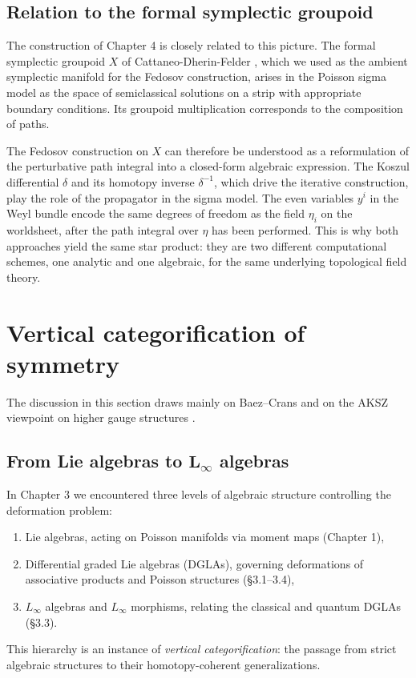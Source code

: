 \documentclass[
  12pt,
  a4paper, oneside
]{report}
\theoremstyle{bolddef}
\theoremstyle{remark}
\numberwithin{equation}{chapter}
\begin{document}
\subsection*{Relation to the formal symplectic groupoid}

The construction of Chapter 4 is closely related to this picture. The formal symplectic groupoid $X$ of Cattaneo-Dherin-Felder \cite{CDF}, which we used as the ambient symplectic manifold for the Fedosov construction, arises in the Poisson sigma model as the space of semiclassical solutions on a strip with appropriate boundary conditions. Its groupoid multiplication corresponds to the composition of paths.

The Fedosov construction on $X$ can therefore be understood as a reformulation of the perturbative path integral into a closed-form algebraic expression. The Koszul differential $\delta$ and its homotopy inverse $\delta^{-1}$, which drive the iterative construction, play the role of the propagator in the sigma model. The even variables $y^i$ in the Weyl bundle encode the same degrees of freedom as the field $\eta_i$ on the worldsheet, after the path integral over $\eta$ has been performed. This is why both approaches yield the same star product: they are two different computational schemes, one analytic and one algebraic, for the same underlying topological field theory.


\section{Vertical categorification of symmetry}
The discussion in this section draws mainly on Baez--Crans and on the AKSZ viewpoint on higher gauge structures \cite{BaezCrans,AKSZ}.


\subsection*{From Lie algebras to \texorpdfstring{$\mathbf{L_{\infty}}$}{L-infinity} algebras}

In Chapter 3 we encountered three levels of algebraic structure controlling the deformation problem:
\begin{enumerate}
\item Lie algebras, acting on Poisson manifolds via moment maps (Chapter 1),
\item Differential graded Lie algebras (DGLAs), governing deformations of associative products and Poisson structures (\S 3.1--3.4),
\item $L_\infty$ algebras and $L_\infty$ morphisms, relating the classical and quantum DGLAs (\S 3.3).
\end{enumerate}
This hierarchy is an instance of \emph{vertical categorification}: the passage from strict algebraic structures to their homotopy-coherent generalizations.
\end{document}
